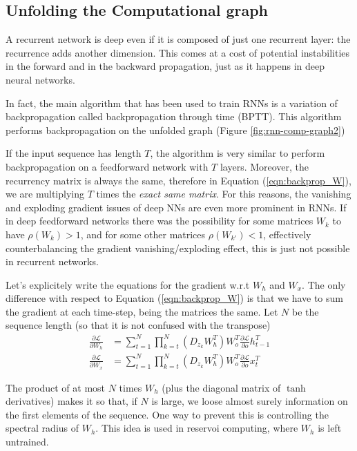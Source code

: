 \documentclass[oneside]{book}
\theoremstyle{definition}
\theoremstyle{plain}
\begin{document}
\subsection{Unfolding the Computational graph}
A recurrent network is deep even if it is composed of just one recurrent layer: the recurrence adds another dimension. This comes at a cost of potential instabilities in the forward and in the backward propagation, just as it happens in deep neural networks.

In fact, the main algorithm that has been used to train RNNs is a variation of backpropagation called backpropagation through time (BPTT). 
This algorithm performs backpropagation on the unfolded graph (Figure \ref{fig:rnn-comp-graph2})

If the input sequence has length $T$, the algorithm is very similar to perform backpropagation on a feedforward network with $T$ layers. Moreover, the recurrency matrix is always the same, therefore in Equation (\ref{eqn:backprop_W}), we are multiplying $T$ times the \textit{exact same matrix}. For this reasons, the vanishing and exploding gradient issues of deep NNs are even more prominent in RNNs. If in deep feedforward networks there was the possibility for some matrices $W_k$ to have $\rho(W_k)>1$, and for some other matrices $\rho(W_{k'})<1$, effectively counterbalancing the gradient vanishing/exploding effect, this is just not possible in recurrent networks.

Let's explicitely write the equations for the gradient w.r.t $W_h$ and $W_x$. The only difference with respect to Equation (\ref{eqn:backprop_W}) is that we have to sum the gradient at each time-step, being the matrices the same. Let $N$ be the sequence length (so that it is not confused with the transpose)
\begin{align}
\label{eqn:bptt_h}
        \frac{\partial \mathcal{L}}{\partial W_h} &=\sum_{t=1}^N \prod_{k=t}^{N} \left( D_{z_k} W^T_{h}\right) W_o^T\frac{\partial\mathcal{L}}{\partial o} h^T_{t-1} \\
\label{eqn:bptt_x}
        \frac{\partial \mathcal{L}}{\partial W_x} &=\sum_{t=1}^N \prod_{k=t}^{N} \left( D_{z_k} W^T_{h}\right) W_o^T\frac{\partial\mathcal{L}}{\partial o} x^T_{t} 
\end{align}

The product of at most $N$ times $W_h$ (plus the diagonal matrix of $\tanh$ derivatives) makes it so that, if $N$ is large, we loose almost surely information on the first elements of the sequence. One way to prevent this is controlling the spectral radius of $W_h$. This idea is used in reservoi computing, where $W_h$ is left untrained.
\end{document}
